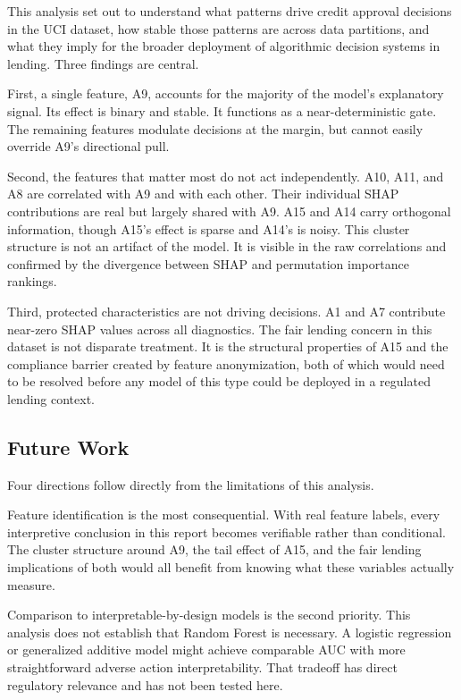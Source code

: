 \documentclass[11pt]{article}
\begin{document}
This analysis set out to understand what patterns drive credit approval decisions in the UCI dataset, how stable those patterns are across data partitions, and what they imply for the broader deployment of algorithmic decision systems in lending. Three findings are central.

First, a single feature, A9, accounts for the majority of the model's explanatory signal. Its effect is binary and stable. It functions as a near-deterministic gate. The remaining features modulate decisions at the margin, but cannot easily override A9's directional pull.

Second, the features that matter most do not act independently. A10, A11, and A8 are correlated with A9 and with each other. Their individual SHAP contributions are real but largely shared with A9. A15 and A14 carry orthogonal information, though A15's effect is sparse and A14's is noisy. This cluster structure is not an artifact of the model. It is visible in the raw correlations and confirmed by the divergence between SHAP and permutation importance rankings.

Third, protected characteristics are not driving decisions. A1 and A7 contribute near-zero SHAP values across all diagnostics. The fair lending concern in this dataset is not disparate treatment. It is the structural properties of A15 and the compliance barrier created by feature anonymization, both of which would need to be resolved before any model of this type could be deployed in a regulated lending context.

\subsection{Future Work}

Four directions follow directly from the limitations of this analysis.

Feature identification is the most consequential. With real feature labels, every interpretive conclusion in this report becomes verifiable rather than conditional. The cluster structure around A9, the tail effect of A15, and the fair lending implications of both would all benefit from knowing what these variables actually measure.

Comparison to interpretable-by-design models is the second priority. This analysis does not establish that Random Forest is necessary. A logistic regression or generalized additive model might achieve comparable AUC with more straightforward adverse action interpretability. That tradeoff has direct regulatory relevance and has not been tested here.
\end{document}
